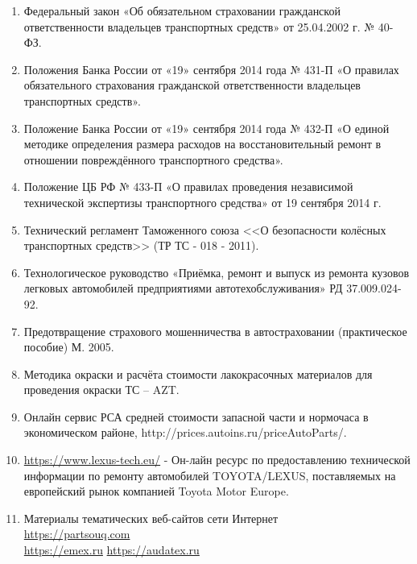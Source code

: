 \begin{enumerate}
	\item   Федеральный закон «Об обязательном страховании гражданской ответственности владельцев транспортных средств» от 25.04.2002 г. № 40-ФЗ.
	\item  Положения Банка России от «19» сентября 2014 года № 431-П «О правилах обязательного страхования гражданской ответственности владельцев транспортных средств».
	\item  Положение Банка России от «19» сентября 2014 года № 432-П «О единой методике определения размера расходов на восстановительный ремонт в отношении повреждённого транспортного средства».
	\item  Положение ЦБ РФ № 433-П «О правилах проведения независимой технической экспертизы транспортного средства» от 19 сентября 2014 г.
	\item  Технический регламент Таможенного союза <<О безопасности колёсных транспортных средств>> (ТР ТС - 018 - 2011).
	\item  Технологическое руководство «Приёмка, ремонт и выпуск из ремонта кузовов легковых автомобилей предприятиями автотехобслуживания» РД 37.009.024-92.
	\item  Предотвращение страхового мошенничества в автостраховании  (практическое  пособие)  М.  2005.
	\item  Методика окраски и расчёта стоимости лакокрасочных материалов для проведения окраски ТС – AZT. 
	\item  Онлайн сервис РСА средней стоимости запасной части и нормочаса в экономическом районе,    http://prices.autoins.ru/priceAutoParts/.
	\item \url{https://www.lexus-tech.eu/} - Он-лайн ресурс по предоставлению технической информации по ремонту автомобилей TOYOTA/LEXUS, поставляемых на европейский рынок компанией Toyota Motor Europe.
	\item  	Материалы тематических веб-сайтов сети Интернет\\
	\url{https://partsouq.com}\\
	\url{https://emex.ru}
	\url{https://audatex.ru}
\end{enumerate}